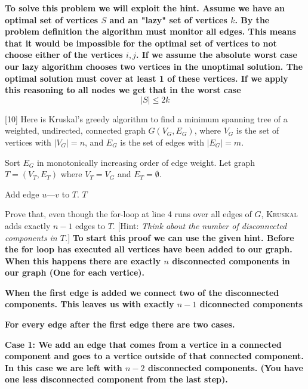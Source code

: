 \documentclass[addpoints]{exam}
\def\mysolution#1{}    %
\begin{document}
\begin{questions}
\textbf{To solve this problem we will exploit the hint. Assume we have an optimal set of vertices $S$ and an "lazy" set of vertices $k$. By the problem definition the algorithm must monitor all edges. This means that it would be impossible for the optimal set of vertices to not choose either of the vertices ${i,j}$. If we assume the absolute worst case our lazy algorithm chooses two vertices in the unoptimal solution. The optimal solution must cover at least 1 of these vertices. If we apply this reasoning to all nodes we get that in the worst case}
\[|S| \le 2k\]

\mysolution{

}

[10]
Here is Kruskal's greedy algorithm to find a minimum spanning tree of a weighted, undirected, connected graph $G(V_G,E_G)$, where $V_G$ is the set of vertices with $|V_G|=n$, and $E_G$ is the set of edges with $|E_G|=m$.
\begin{algorithmic}[1]
    \State Sort $E_G$ in monotonically increasing order of edge weight.
    \State Let graph $T=(V_T,E_T)$ where $V_T=V_G$ and $E_T=\emptyset$.
    
            \State Add edge $u$---$v$ to $T$.
        \EndIf
    \EndFor
    \State \Return $T$
    \EndFunction
\end{algorithmic}

Prove that, even though the for-loop at line 4 runs over all edges of $G$, \textsc{Kruskal} adds exactly $n-1$ edges to $T$. [Hint: \textit{Think about the number of disconnected components in $T$.}]
\textbf{To start this proof we can use the given hint. Before the for loop has executed all vertices have been added to our graph. When this happens there are exactly $n$ disconnected components in our graph (One for each vertice).}

\textbf{When the first edge is added we connect two of the disconnected components. This leaves us with exactly $n-1$ diconnected components}

\textbf{For every edge after the first edge there are two cases.}

\textbf{Case 1: We add an edge that comes from a vertice in a connected component and goes to a vertice outside of that connected component. In this case we are left with $n-2$ disconnected components. (You have one less disconnected component from the last step).}


\end{questions}
\end{document}
